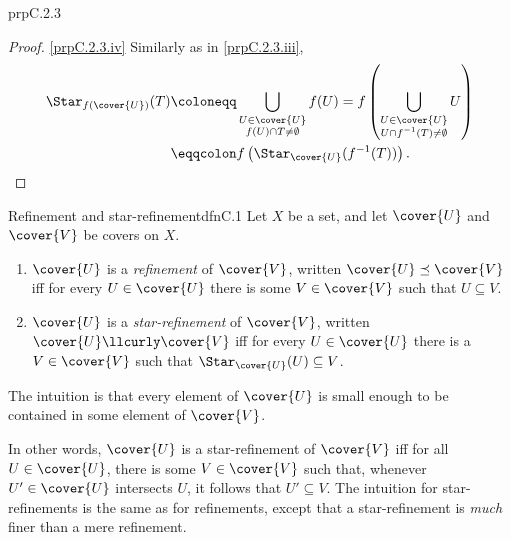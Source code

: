 \begin{prp}{}{prpC.2.3}
\begin{proof}
\blankline
\noindent
\cref{prpC.2.3.iv} Similarly as in \cref{prpC.2.3.iii},
\begin{equation}
\begin{split}
\Star _{f(\cover{U})}(T) & \coloneqq \bigcup _{\substack{U\in \cover{U} \\ f(U)\cap T\neq \emptyset}}f(U)=f\left( \bigcup _{\substack{U\in \cover{U} \\ U\cap f^{-1}(T)\neq \emptyset}}U\right) \\
& \eqqcolon f\left( \Star _{\cover{U}}(f^{-1}(T))\right) .
\end{split}
\end{equation}
\end{proof}
\end{prp}

\begin{dfn}{Refinement and star-refinement}{dfnC.1}
Let $X$ be a set, and let $\cover{U}$ and $\cover{V}$ be covers on $X$.
\begin{enumerate}
\item $\cover{U}$ is a \emph{refinement} of $\cover{V}$, written $\cover{U}\preceq \cover{V}$ iff for every $U\in \cover{U}$ there is some $V\in \cover{V}$ such that $U\subseteq V$.
\item $\cover{U}$ is a \emph{star-refinement} of $\cover{V}$, written $\cover{U}\llcurly \cover{V}$ iff for every $U\in \cover{U}$ there is a $V\in \cover{V}$ such that $\Star _{\cover{U}}(U)\subseteq V$.
\end{enumerate}
\begin{rmk}
The intuition is that every element of $\cover{U}$ is small enough to be contained in some element of $\cover{V}$.
\end{rmk}
\begin{rmk}
In other words, $\cover{U}$ is a star-refinement of $\cover{V}$ iff for all $U\in \cover{U}$, there is some $V\in \cover{V}$ such that, whenever $U'\in \cover{U}$ intersects $U$, it follows that $U'\subseteq V$.  The intuition for star-refinements is the same as for refinements, except that a star-refinement is \emph{much} finer than a mere refinement.
\end{rmk}
\end{dfn}
